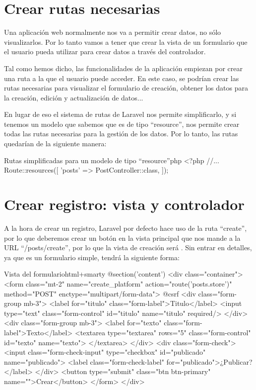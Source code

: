 \chapter{Crear rutas necesarias}

Una aplicación web normalmente nos va a permitir crear datos, no sólo visualizarlos. Por lo tanto vamos a tener que crear la vista de un formulario que el usuario pueda utilizar para crear datos a través del controlador.

Tal como hemos dicho, las funcionalidades de la aplicación empiezan por crear una ruta a la que el usuario puede acceder. En este caso, se podrían crear las rutas necesarias para visualizar el formulario de creación, obtener los datos para la creación, edición y actualización de datos...

En lugar de eso el sistema de rutas de Laravel nos permite simplificarlo, y si tenemos un modelo que sabemos que es de tipo “resource”, nos permite crear todas las rutas necesarias para la gestión de los datos. Por lo tanto, las rutas quedarían de la siguiente manera:

\begin{mycode}{Rutas simplificadas para un modelo de tipo “resource”}{php}{}
<?php
//...
Route::resources([
    'posts' => PostController::class,
]);
\end{mycode}

\chapter{Crear registro: vista y controlador}

A la hora de crear un registro, Laravel por defecto hace uso de la ruta “create”, por lo que deberemos crear un botón en la vista principal que nos mande a la URL “/posts/create”, por lo que la vista de creación será . Sin entrar en detalles, ya que es un formulario simple, tendrá la siguiente forma:

\begin{mycode}{Vista del formulario}{html+smarty}{{\footnotesize }}
@section('content')
<div class="container">
  <form class="mt-2" name="create_platform" action="{{route('posts.store')}}"
    method="POST" enctype="multipart/form-data">
    @csrf
    <div class="form-group mb-3">
      <label for="titulo" class="form-label">Titulo</label>
      <input type="text" class="form-control" id="titulo" name="titulo" required/>
    </div>
    <div class="form-group mb-3">
      <label for="texto" class="form-label">Texto</label>
      <textarea type="textarea" rows="5" class="form-control" id="texto" name="texto">
      </textarea>
    </div>
    <div class="form-check">
      <input class="form-check-input" type="checkbox" id="publicado" name="publicado">
      <label class="form-check-label" for="publicado">¿Publicar?
      </label>
    </div>
  <button type="submit" class="btn btn-primary" name="">Crear</button>
</form>
</div>
\end{mycode}

